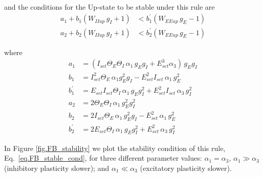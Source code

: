 \documentclass[twocolumn]{article}
\newcommand{\EE}{\mathit{EE}}
\newcommand{\II}{\mathit{II}}
\newcommand{\set}{\mathit{set}}
\newcommand{\up}{\mathit{up}}
\begin{document}
\noindent and the conditions for the Up-state to be stable under this rule are
\begin{equation}
\begin{aligned}
a_1 + b_1(W_{\II\up} \, g_I + 1) & < b_1^\prime(W_{\EE\up} \, g_E - 1) \\
a_2 + b_2(W_{\II\up} \, g_I + 1) & < b_2^\prime(W_{\EE\up} \, g_E - 1)
\end{aligned}
\label{eq.FB_stable_cond}
\end{equation}

\noindent where
\begin{displaymath}
\begin{aligned}
a_1 & = (I_{\set} \Theta_E \Theta_I \, \alpha_1 \, g_E g_I + E_{\set}^3 \alpha_3) \, g_E g_I \\
b_1 & = I_{\set}^2 \Theta_E \, \alpha_1 g_E^2 g_I - E_{\set}^2 I_{\set} \, \alpha_1 \, g_E^2 \\
b_1^\prime & = E_{\set} I_{\set} \Theta_I \, \alpha_1 \, g_E g_I^2 + E_{\set}^2 I_{\set} \, \alpha_3 \, g_I^2 \\
a_2 & = 2 \Theta_E \Theta_I \, \alpha_1 \, g_E^2 g_I^2 \\
b_2 & = 2I_{\set} \Theta_E \, \alpha_1 \, g_E^2 g_I - E_{\set}^2 \, \alpha_1 \, g_E^2 \\
b_2^\prime & = 2E_{\set} \Theta_I \, \alpha_1 \, g_E g_I^2 + E_{\set}^2 \, \alpha_3 \, g_I^2
\end{aligned}
\end{displaymath}


In Figure \ref{fig.FB_stability} we plot the stability condition of this rule, Eq.\ \ref{eq.FB_stable_cond}, for three different parameter values: $\alpha_1 = \alpha_3$, $\alpha_1 \gg \alpha_3$ (inhibitory plasticity slower); and $\alpha_1 \ll \alpha_3$ (excitatory plasticity slower).
\end{document}

